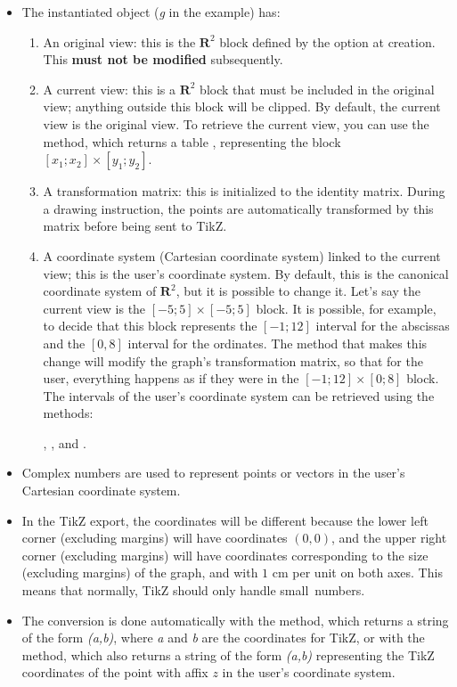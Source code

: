 \begin{itemize}
\item The instantiated object (\emph{g} in the example) has:
    \begin{enumerate}
    \item An original view: this is the $\mathbf R^2$ block defined by the  option at creation. This \textbf{must not be modified} subsequently.

    \item A current view: this is a $\mathbf R^2$ block that must be included in the original view; anything outside this block will be clipped. By default, the current view is the original view. To retrieve the current view, you can use the  method, which returns a table , representing the block $[x_1;x_2]\times [y_1;y_2]$.

    \item A transformation matrix: this is initialized to the identity matrix. During a drawing instruction, the points are automatically transformed by this matrix before being sent to TikZ.

    \item A coordinate system (Cartesian coordinate system) linked to the current view; this is the user's coordinate system. By default, this is the canonical coordinate system of $\mathbf R^2$, but it is possible to change it. Let's say the current view is the $[-5;5]\times[-5;5]$ block. It is possible, for example, to decide that this block represents the $[-1;12]$ interval for the abscissas and the $[0,8]$ interval for the ordinates. The method that makes this change will modify the graph's transformation matrix, so that for the user, everything happens as if they were in the $[-1;12]\times [0;8]$ block. The intervals of the user's coordinate system can be retrieved using the methods: \par
    \hfil{}, ,  and .\hfil
    \end{enumerate}

\item Complex numbers are used to represent points or vectors in the user's Cartesian coordinate system.

\item In the TikZ export, the coordinates will be different because the lower left corner (excluding margins) will have coordinates $(0,0)$, and the upper right corner (excluding margins) will have coordinates corresponding to the size (excluding margins) of the graph, and with $1$ cm per unit on both axes. This means that normally, TikZ should only handle \og small\fg\ numbers. 

\item The conversion is done automatically with the  method, which returns a string of the form \emph{(a,b)}, where \emph{a} and \emph{b} are the coordinates for TikZ, or with the  method, which also returns a string of the form \emph{(a,b)} representing the TikZ coordinates of the point with affix $z$ in the user's coordinate system.
\end{itemize}

